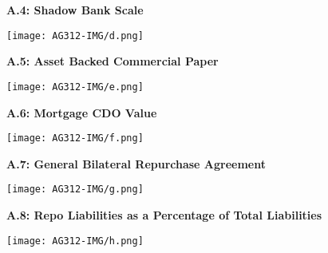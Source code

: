 \documentclass[11pt, english]{article}
\begin{document}
        \textbf{A.4: Shadow Bank Scale}

        \begin{center}
                \texttt{[image: AG312-IMG/d.png]}
        \end{center}

	\textbf{A.5: Asset Backed Commercial Paper}

        \begin{center}
                \texttt{[image: AG312-IMG/e.png]}
        \end{center}

        \textbf{A.6: Mortgage CDO Value}

        \begin{center}
                \texttt{[image: AG312-IMG/f.png]}
        \end{center}

\newpage

        \textbf{A.7: General Bilateral Repurchase Agreement}

        \begin{center}
                \texttt{[image: AG312-IMG/g.png]}
        \end{center}

	\textbf{A.8: Repo Liabilities as a Percentage of Total Liabilities}

        \begin{center}
                \texttt{[image: AG312-IMG/h.png]}
        \end{center}

\newpage

\renewcommand\refname{Bibliography}
\end{document}

